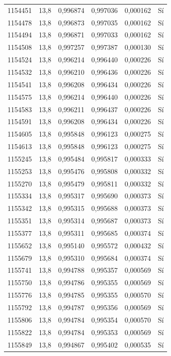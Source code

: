 \begin{longtable}{lccccc}
1154451 & 13,8 & 0,996874 & 0,997036 & 0,000162 & Sí \\
1154478 & 13,8 & 0,996873 & 0,997035 & 0,000162 & Sí \\
1154494 & 13,8 & 0,996871 & 0,997033 & 0,000162 & Sí \\
1154508 & 13,8 & 0,997257 & 0,997387 & 0,000130 & Sí \\
1154524 & 13,8 & 0,996214 & 0,996440 & 0,000226 & Sí \\
1154532 & 13,8 & 0,996210 & 0,996436 & 0,000226 & Sí \\
1154541 & 13,8 & 0,996208 & 0,996434 & 0,000226 & Sí \\
1154575 & 13,8 & 0,996214 & 0,996440 & 0,000226 & Sí \\
1154583 & 13,8 & 0,996211 & 0,996437 & 0,000226 & Sí \\
1154591 & 13,8 & 0,996208 & 0,996434 & 0,000226 & Sí \\
1154605 & 13,8 & 0,995848 & 0,996123 & 0,000275 & Sí \\
1154613 & 13,8 & 0,995848 & 0,996123 & 0,000275 & Sí \\
1155245 & 13,8 & 0,995484 & 0,995817 & 0,000333 & Sí \\
1155253 & 13,8 & 0,995476 & 0,995808 & 0,000332 & Sí \\
1155270 & 13,8 & 0,995479 & 0,995811 & 0,000332 & Sí \\
1155334 & 13,8 & 0,995317 & 0,995690 & 0,000373 & Sí \\
1155342 & 13,8 & 0,995315 & 0,995688 & 0,000373 & Sí \\
1155351 & 13,8 & 0,995314 & 0,995687 & 0,000373 & Sí \\
1155377 & 13,8 & 0,995311 & 0,995685 & 0,000374 & Sí \\
1155652 & 13,8 & 0,995140 & 0,995572 & 0,000432 & Sí \\
1155679 & 13,8 & 0,995310 & 0,995684 & 0,000374 & Sí \\
1155741 & 13,8 & 0,994788 & 0,995357 & 0,000569 & Sí \\
1155750 & 13,8 & 0,994786 & 0,995355 & 0,000569 & Sí \\
1155776 & 13,8 & 0,994785 & 0,995355 & 0,000570 & Sí \\
1155792 & 13,8 & 0,994787 & 0,995356 & 0,000569 & Sí \\
1155806 & 13,8 & 0,994784 & 0,995354 & 0,000570 & Sí \\
1155822 & 13,8 & 0,994784 & 0,995353 & 0,000569 & Sí \\
1155849 & 13,8 & 0,994867 & 0,995402 & 0,000535 & Sí \\

\end{longtable}
